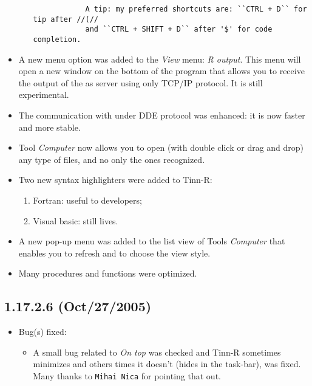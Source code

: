 \begin{itemize}
\begin{enumerate}
        \begin{footnotesize}
          \begin{verbatim}
            A tip: my preferred shortcuts are: ``CTRL + D`` for tip after //(//
            and ``CTRL + SHIFT + D`` after '$' for code completion.
          \end{verbatim}
        \end{footnotesize}

    \end{enumerate}
  \item A new menu option was added to the \textit{View} menu:
    \textit{R output}. This menu will open a new window on the
    bottom of the program that allows you to receive the output
    of the \RR{} as server using only TCP/IP protocol. It is still
    experimental.
  \item The communication with \RR{} under DDE protocol was enhanced:
    it is now faster and more stable.
  \item Tool \textit{Computer} now allows you to open (with double
    click or drag and drop) any type of files, and no only
    the ones recognized.
  \item Two new syntax highlighters were added to Tinn-R:
    \begin{enumerate}
      \item Fortran: useful to \RR{} developers;
      \item Visual basic: still lives.
    \end{enumerate}
  \item A new pop-up menu was added to the list view of Tools
    \textit{Computer} that enables you to refresh and to choose
    the view style.
  \item Many procedures and functions were optimized.
\end{itemize}


\subsection{1.17.2.6 (Oct/27/2005)}

\begin{itemize}
  \item Bug(s) fixed:
    \begin{itemize}
      \item A small bug related to \textit{On top} was checked and Tinn-R sometimes
        minimizes and others times it doesn't (hides in the task-bar), was fixed. Many
        thanks to \texttt{Mihai Nica} for pointing that out.
    \end{itemize}
\end{itemize}


